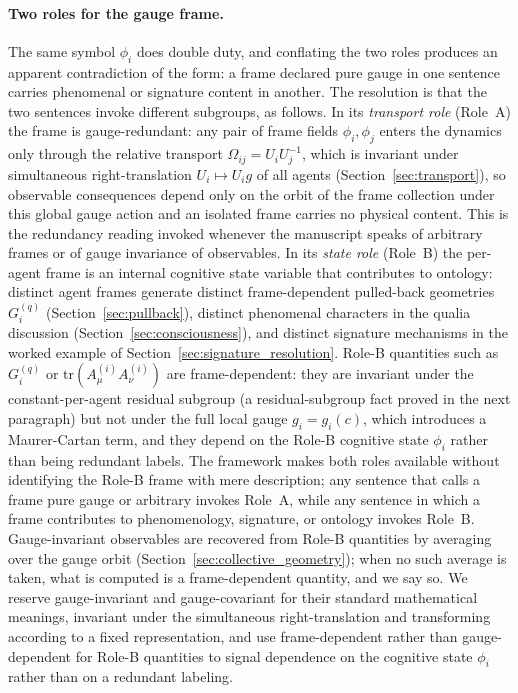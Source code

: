 \documentclass[11pt]{article}
\begin{document}
\paragraph{Two roles for the gauge frame.} The same symbol $\phi_i$ does double duty, and conflating the two roles produces an apparent contradiction of the form: a frame declared pure gauge in one sentence carries phenomenal or signature content in another. The resolution is that the two sentences invoke different subgroups, as follows. In its \emph{transport role} (Role~A) the frame is gauge-redundant: any pair of frame fields $\phi_i, \phi_j$ enters the dynamics only through the relative transport $\Omega_{ij} = U_iU_j^{-1}$, which is invariant under simultaneous right-translation $U_i \mapsto U_i g$ of all agents (Section~\ref{sec:transport}), so observable consequences depend only on the orbit of the frame collection under this global gauge action and an isolated frame carries no physical content. This is the redundancy reading invoked whenever the manuscript speaks of arbitrary frames or of gauge invariance of observables. In its \emph{state role} (Role~B) the per-agent frame is an internal cognitive state variable that contributes to ontology: distinct agent frames generate distinct frame-dependent pulled-back geometries $G_i^{(q)}$ (Section~\ref{sec:pullback}), distinct phenomenal characters in the qualia discussion (Section~\ref{sec:consciousness}), and distinct signature mechanisms in the worked example of Section~\ref{sec:signature_resolution}. Role-B quantities such as $G_i^{(q)}$ or $\mathrm{tr}(A^{(i)}_\mu A^{(i)}_\nu)$ are frame-dependent: they are invariant under the constant-per-agent residual subgroup (a residual-subgroup fact proved in the next paragraph) but not under the full local gauge $g_i = g_i(c)$, which introduces a Maurer-Cartan term, and they depend on the Role-B cognitive state $\phi_i$ rather than being redundant labels. The framework makes both roles available without identifying the Role-B frame with mere description; any sentence that calls a frame pure gauge or arbitrary invokes Role~A, while any sentence in which a frame contributes to phenomenology, signature, or ontology invokes Role~B. Gauge-invariant observables are recovered from Role-B quantities by averaging over the gauge orbit (Section~\ref{sec:collective_geometry}); when no such average is taken, what is computed is a frame-dependent quantity, and we say so. We reserve gauge-invariant and gauge-covariant for their standard mathematical meanings, invariant under the simultaneous right-translation and transforming according to a fixed representation, and use frame-dependent rather than gauge-dependent for Role-B quantities to signal dependence on the cognitive state $\phi_i$ rather than on a redundant labeling.
\end{document}
